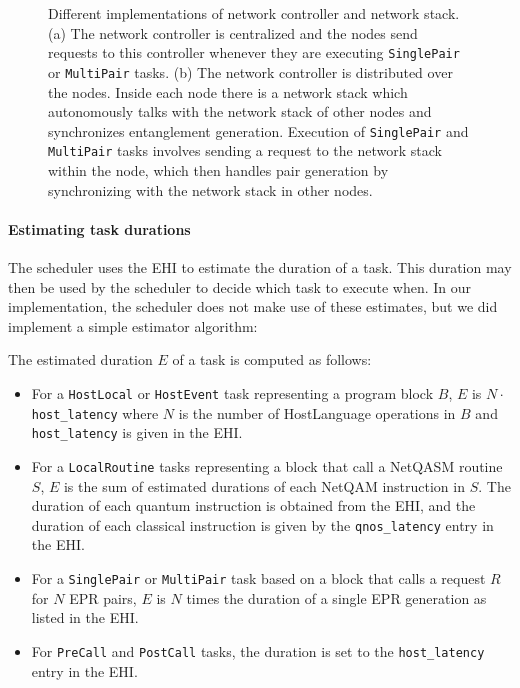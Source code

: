 \begin{figure*}
    \newcommand{\networkcontrollerfigheight}{4.5cm}
    \centering
    \qquad
    \caption{
    Different implementations of network controller and network stack.
    (a) The network controller is centralized and the nodes send requests to this controller
    whenever they are executing \texttt{SinglePair} or \texttt{MultiPair} tasks.
    (b) The network controller is distributed over the nodes. Inside each node there is a network stack which autonomously talks with the network stack of other nodes and synchronizes entanglement generation.
    Execution of \texttt{SinglePair} and \texttt{MultiPair} tasks involves sending a request to the network stack within the node, which then handles pair generation by synchronizing with the network stack in other nodes.
    }%
    \label{fig:app:network_controller_types}
\end{figure*}


\paragraph{Estimating task durations}
The scheduler uses the EHI to estimate the duration of a task.
This duration may then be used by the scheduler to decide which task to execute when.
In our implementation, the scheduler does not make use of these estimates, but we did implement a simple estimator algorithm:

The estimated duration $E$ of a task is computed as follows:
\begin{itemize}
    \item For a \texttt{HostLocal} or \texttt{HostEvent} task representing a program block $B$, $E$ is $N \cdot$ \texttt{host\_latency} where $N$ is the number of HostLanguage operations in $B$ and \texttt{host\_latency} is given in the EHI.
    \item For a \texttt{LocalRoutine} tasks representing a block that call a NetQASM routine $S$, 
        $E$ is the sum of estimated durations of each NetQAM instruction in $S$. The duration of each quantum instruction is obtained from the EHI, and the duration of each classical instruction is given by the \texttt{qnos\_latency} entry in the EHI.
    \item For a \texttt{SinglePair} or \texttt{MultiPair} task based on a block that calls a request $R$ for $N$ EPR pairs, $E$ is $N$ times the duration of a single EPR generation as listed in the EHI.
    \item For \texttt{PreCall} and \texttt{PostCall} tasks, the duration is set to the \texttt{host\_latency} entry in the EHI.
\end{itemize}

